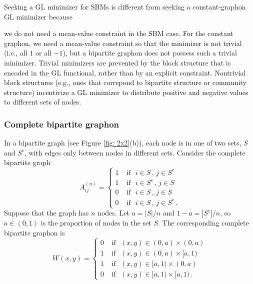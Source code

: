 \documentclass[11pt]{amsart}
\numberwithin{equation}{section}
\begin{document}
Seeking a GL minimizer for SBMs is different from seeking a constant-graphon GL minimizer because {we do not need a {mean-value constraint} 
in the SBM case. For the constant graphon, we need a {mean-value constraint} so that the minimizer is not trivial (i.e., all $1$ or all $-1$), but a bipartite graphon does not possess such a trivial minimizer. Trivial minimizers are prevented by the block structure that is encoded in the GL functional, rather than by an explicit constraint. Nontrivial block structures (e.g., ones that correpond to bipartite structure or community structure) incentivize a GL minimizer to distribute positive and negative values to different sets of nodes.



\subsubsection{Complete bipartite graphon} \label{sec: 2x2 bipartite}

In a bipartite graph (see Figure \ref{fig: 2x2}(b)), each node is in one of two sets, $S$ and $S^c$, with edges only between nodes in different sets. Consider the complete bipartite graph 
\begin{equation}\label{eq: bipartite graph}
    A^{(n)}_{ij} = \begin{cases}
        1 &\text{ if }\,\, i\in S\,, \, j\in S^c 
        \\
        1 &\text{ if } \,\, i\in S^c\,, \, j \in S
        \\
        0 &\text{ if } \,\, i\in S\, , \, j\in S
        \\
        0 &\text{ if } \,\, i \in S\,, \, j \in S^c \,. 
    \end{cases}
\end{equation}
Suppose that the graph has $n$ nodes.
Let {$a = {|S|}/{n}$ and $1 - a = {|S^c|}/{n}$,} so $a \in (0,1)$ is the proportion of nodes in {the} set $S$. The corresponding complete bipartite graphon is
\begin{equation}\label{eq: bipartite graphon}
	W(x,y) = 
		\begin{cases}
	0 &\text{ if } \,\, (x,y)\in (0,a) \times (0,a) \\
	1 &\text{ if  } \,\, (x,y)\in (0,a)\times [a,1) \\
	1 &\text{ if  } \,\, (x,y)\in [a,1) \times (0,a) \\
	0 &\text{ if  } \,\, (x,y)\in [a,1) \times [a,1)\,.
		\end{cases} 
\end{equation}

}
\end{document}
